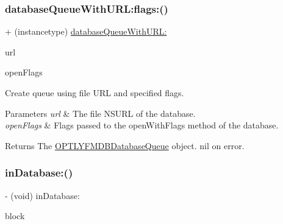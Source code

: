 \subsubsection{\texorpdfstring{database\+Queue\+With\+U\+R\+L\+:flags\+:()}{databaseQueueWithURL:flags:()}}
{\footnotesize\ttfamily + (instancetype) \mbox{\hyperlink{interface_o_p_t_l_y_f_m_d_b_database_queue_af55595f0000fc655efb628f84a90a4cd}{database\+Queue\+With\+U\+R\+L\+:}} \begin{DoxyParamCaption}\item[{(N\+S\+U\+RL $\ast$\+\_\+\+Nullable)}]{url }\item[{flags:(int)}]{open\+Flags }\end{DoxyParamCaption}}

Create queue using file U\+RL and specified flags.


\begin{DoxyParams}{Parameters}
{\em url} & The file {\ttfamily N\+S\+U\+RL} of the database. \\
\hline
{\em open\+Flags} & Flags passed to the open\+With\+Flags method of the database.\\
\hline
\end{DoxyParams}
\begin{DoxyReturn}{Returns}
The {\ttfamily \mbox{\hyperlink{interface_o_p_t_l_y_f_m_d_b_database_queue}{O\+P\+T\+L\+Y\+F\+M\+D\+B\+Database\+Queue}}} object. {\ttfamily nil} on error. 
\end{DoxyReturn}
\mbox{\label{interface_o_p_t_l_y_f_m_d_b_database_queue_abc4d8336b211f69f6bd9dddfbf867e77}} 
\subsubsection{\texorpdfstring{in\+Database\+:()}{inDatabase:()}}
{\footnotesize\ttfamily -\/ (void) in\+Database\+: \begin{DoxyParamCaption}\item[{(\+\_\+\+\_\+attribute\+\_\+\+\_\+((noescape)) void($^\wedge$)(\mbox{\hyperlink{interface_o_p_t_l_y_f_m_d_b_database}{O\+P\+T\+L\+Y\+F\+M\+D\+B\+Database}} $\ast$db))}]{block }\end{DoxyParamCaption}}

